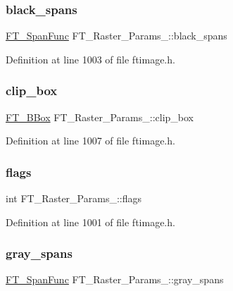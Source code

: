 \subsubsection{\texorpdfstring{black\_spans}{black\_spans}}
{\footnotesize\ttfamily \mbox{\hyperlink{ftimage_8h_abae5f0d92287252b367d3e8210ec4e3a}{F\+T\+\_\+\+Span\+Func}} F\+T\+\_\+\+Raster\+\_\+\+Params\+\_\+\+::black\+\_\+spans}



Definition at line 1003 of file ftimage.\+h.

\mbox{\label{struct_f_t___raster___params___ab32f75f19d9cacb20e410886c055e306}} 
\subsubsection{\texorpdfstring{clip\_box}{clip\_box}}
{\footnotesize\ttfamily \mbox{\hyperlink{ftimage_8h_ae341c4eb5a7199947a13b2a1dcaf7af7}{F\+T\+\_\+\+B\+Box}} F\+T\+\_\+\+Raster\+\_\+\+Params\+\_\+\+::clip\+\_\+box}



Definition at line 1007 of file ftimage.\+h.

\mbox{\label{struct_f_t___raster___params___a1a28ab69b8296b4378886d1a2b57d333}} 
\subsubsection{\texorpdfstring{flags}{flags}}
{\footnotesize\ttfamily int F\+T\+\_\+\+Raster\+\_\+\+Params\+\_\+\+::flags}



Definition at line 1001 of file ftimage.\+h.

\mbox{\label{struct_f_t___raster___params___a456191f1944775933e3d9d36c8632c35}} 
\subsubsection{\texorpdfstring{gray\_spans}{gray\_spans}}
{\footnotesize\ttfamily \mbox{\hyperlink{ftimage_8h_abae5f0d92287252b367d3e8210ec4e3a}{F\+T\+\_\+\+Span\+Func}} F\+T\+\_\+\+Raster\+\_\+\+Params\+\_\+\+::gray\+\_\+spans}



